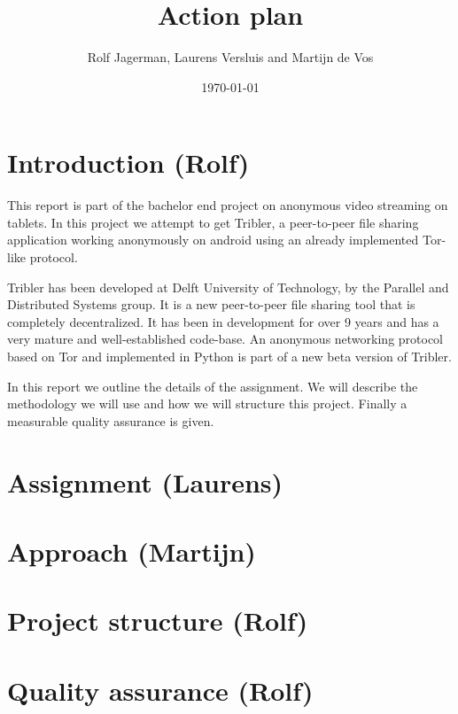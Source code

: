 \documentclass{article}
\title{Action plan}
\author{Rolf Jagerman, Laurens Versluis and Martijn de Vos}
\date{\today}
\begin{document}
\maketitle

\section{Introduction (Rolf)}
This report is part of the bachelor end project on anonymous video streaming on tablets. In this project we attempt to get Tribler, a peer-to-peer file sharing application working anonymously on android using an already implemented Tor-like protocol.

Tribler has been developed at Delft University of Technology, by the Parallel and Distributed Systems group. It is a new peer-to-peer file sharing tool that is completely decentralized. It has been in development for over 9 years and has a very mature and well-established code-base. An anonymous networking protocol based on Tor and implemented in Python is part of a new beta version of Tribler.

In this report we outline the details of the assignment. We will describe the methodology we will use and how we will structure this project. Finally a measurable quality assurance is given.

\section{Assignment (Laurens)}

\section{Approach (Martijn)}

\section{Project structure (Rolf)}

\section{Quality assurance (Rolf)}
\end{document}
